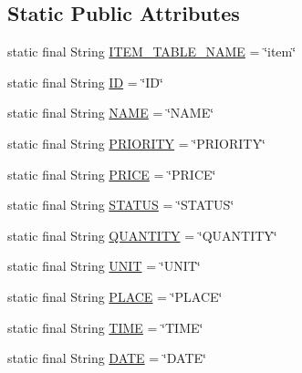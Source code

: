 \subsection*{Static Public Attributes}
\begin{DoxyCompactItemize}
\item 
static final String \hyperlink{classvip2012_1_1g07_1_1shoppinglist_1_1ItemHelper_a1c9b73729f92221e05c6e62cb361d7ab}{I\-T\-E\-M\-\_\-\-T\-A\-B\-L\-E\-\_\-\-N\-A\-M\-E} = \char`\"{}item\char`\"{}
\item 
static final String \hyperlink{classvip2012_1_1g07_1_1shoppinglist_1_1ItemHelper_a6bb17adfa7a6b9a117895a66f0f15edf}{I\-D} = \char`\"{}I\-D\char`\"{}
\item 
static final String \hyperlink{classvip2012_1_1g07_1_1shoppinglist_1_1ItemHelper_a773e78a4e566c4691c217c7fbacab750}{N\-A\-M\-E} = \char`\"{}N\-A\-M\-E\char`\"{}
\item 
static final String \hyperlink{classvip2012_1_1g07_1_1shoppinglist_1_1ItemHelper_a63cb23ee391ca2beb5a28779db85ee58}{P\-R\-I\-O\-R\-I\-T\-Y} = \char`\"{}P\-R\-I\-O\-R\-I\-T\-Y\char`\"{}
\item 
static final String \hyperlink{classvip2012_1_1g07_1_1shoppinglist_1_1ItemHelper_a84dbb86d92039880881973d05fde2ffa}{P\-R\-I\-C\-E} = \char`\"{}P\-R\-I\-C\-E\char`\"{}
\item 
static final String \hyperlink{classvip2012_1_1g07_1_1shoppinglist_1_1ItemHelper_a3a3acf6a228cace9a2d4161875b11958}{S\-T\-A\-T\-U\-S} = \char`\"{}S\-T\-A\-T\-U\-S\char`\"{}
\item 
static final String \hyperlink{classvip2012_1_1g07_1_1shoppinglist_1_1ItemHelper_a3768fd75026bdd908fa59303594e6168}{Q\-U\-A\-N\-T\-I\-T\-Y} = \char`\"{}Q\-U\-A\-N\-T\-I\-T\-Y\char`\"{}
\item 
static final String \hyperlink{classvip2012_1_1g07_1_1shoppinglist_1_1ItemHelper_a4b2f6f4439ec7a2ecc1a7bc24805a2cb}{U\-N\-I\-T} = \char`\"{}U\-N\-I\-T\char`\"{}
\item 
static final String \hyperlink{classvip2012_1_1g07_1_1shoppinglist_1_1ItemHelper_a587d4f82405480bd39b514936202da0d}{P\-L\-A\-C\-E} = \char`\"{}P\-L\-A\-C\-E\char`\"{}
\item 
static final String \hyperlink{classvip2012_1_1g07_1_1shoppinglist_1_1ItemHelper_af4ed8a9409f4623fb7755b37431ad5c0}{T\-I\-M\-E} = \char`\"{}T\-I\-M\-E\char`\"{}
\item 
static final String \hyperlink{classvip2012_1_1g07_1_1shoppinglist_1_1ItemHelper_a544cee85918c2a73299abc45f5de4ea9}{D\-A\-T\-E} = \char`\"{}D\-A\-T\-E\char`\"{}
\end{DoxyCompactItemize}
